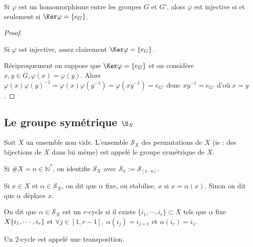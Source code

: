 \begin{prop}
 
Si $\varphi$ est un homomorphisme entre les groupes $G$ et $G'$, alors
$\varphi$ est injective si et seulement si $\Ker \varphi = \{e_G\}$.
\end{prop}

\begin{proof}\ 

 Si $\varphi$ est injective, assez clairement $\Ker \varphi = \{e_G\}$.

 Réciproquement on suppose que $\Ker \varphi = \{e_G\}$ et on considère $x,y\in
G, \varphi(x) = \varphi(y)$. Alors $\varphi(x) \varphi(y)^{-1}= \varphi(x)
\varphi(y^{-1})= \varphi(xy^{-1}) = e_{G'}$ donc $xy^{-1} = e_{G'}$ d'où $x=y$.
\end{proof}


\subsection[Le groupe symétrique]{Le groupe symétrique $\S_X$}
\vspace{0.5em}

\begin{defi}
 
Soit $X$ un ensemble non vide. L'ensemble $\mathcal{S}_X$ des permutations de
$X$ (ie : des bijections de $X$ dans lui même) est appelé le groupe symétrique
de $X$.

Si $\#X = n \in \mathbb{N}^*$, on identifie $\mathcal{S}_X$ avec $\mathcal{S}_n
:= \mathcal{S}_{[1\cdots n]}$.
\end{defi}

\begin{defi} 

Si $x\in X$ et $\alpha \in \mathcal{S}_X$, on dit que $\alpha$ fixe, ou
stabilise, $x$ si $x = \alpha(x)$. Sinon on dit que $\alpha$ déplace $x$.
\end{defi}

\begin{defi}

On dit que $\alpha \in \mathcal{S}_X$ est un $r$-cycle si il existe
$\{i_1,\cdots,i_r\} \subset X$ tels que $\alpha$ fixe $X\-
\{i_1,\cdots,i_r\}$ et $\forall j \in [1,r-1],\ \alpha (i_j) = i_{j+1}$ et
$\alpha(i_r) = i_1$.

Un $2$-cycle est appelé une transposition.
\end{defi}

